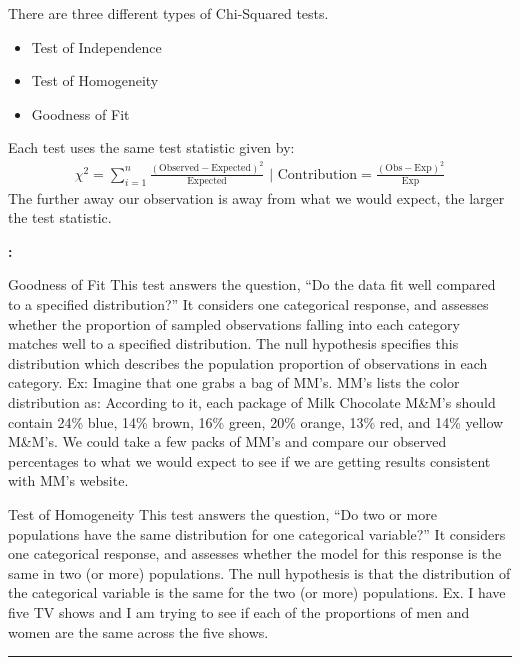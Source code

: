 \documentclass[landscape]{article}
\newcommand{\myline}{\vspace{4pt}\hrule  \vspace{4pt}}
\newcommand{\topic}[2]{
\noindent \textbf{\textsc{\color{harvardcrimson}{#1}}}

\noindent \hspace{-3.5pt}  #2

\myline
}
\newenvironment{tellme}[1]{
\noindent \textbf{\textit{\color{harvardblue}{#1}}:}
\begin{adjustwidth}{9pt}{}
}{
\end{adjustwidth}
}
\newenvironment{compactitem}{
\begin{itemize}[leftmargin=*,labelsep=5pt]
}{
\end{itemize}
}
\newenvironment{compactdesc}{
	\begin{description}[leftmargin=*,labelsep=10pt]
	}{
	\end{description}
}
\begin{document}
\begin{multicols*}{3}
		\topic{Chi-Squared}{
			There are three different types of Chi-Squared tests. 
			\begin{compactitem}
				\item Test of Independence
				\item Test of Homogeneity
				\item Goodness of Fit
			\end{compactitem}
			Each test uses the same test statistic given by: 
			\begin{align*}
			\chi^{2} = \sum\limits_{i = 1}^{n} \frac{(\text{Observed} - \text{Expected})^{2}}{\text{Expected}} \,\, {\bigg \vert} \,\, \text{Contribution} = \frac{(\text{Obs} - \text{Exp})^{2}}{\text{Exp}} 
			\end{align*}
			The further away our observation is away from what we would expect, the larger the test statistic.
			
			\begin{tellme}{Discerning the Three Types of Tests}
				\begin{compactdesc}
					\item[Goodness of Fit]  
					This test answers the question, ``Do the data fit well compared to a specified distribution?'' It considers one categorical response, and assesses whether the proportion of sampled observations falling into each category matches well to a specified distribution. The null hypothesis specifies this distribution which describes the population proportion of observations in each category.
					Ex: Imagine that one grabs a bag of MM's. MM's lists the color distribution as: According to it, each package of Milk Chocolate M\&M’s should contain 24\% blue, 14\% brown, 16\% green, 20\% orange, 13\% red, and 14\% yellow M\&M’s. We could take a few packs of MM's and compare our observed percentages to what we would expect to see if we are getting results consistent with MM's website. 
					
					\item[Test of Homogeneity] 
					This test answers the question, ``Do two or more populations have the same distribution for one categorical variable?''  It considers one categorical response, and assesses whether the model for this response is the same in two (or more) populations. The null hypothesis is that the distribution of the categorical variable is the same for the two (or more) populations.
					Ex. I have five TV shows and I am trying to see if each of the proportions of men and women are the same across the five shows. 
					

\end{compactdesc}
\end{tellme}}
\end{multicols*}
\end{document}

